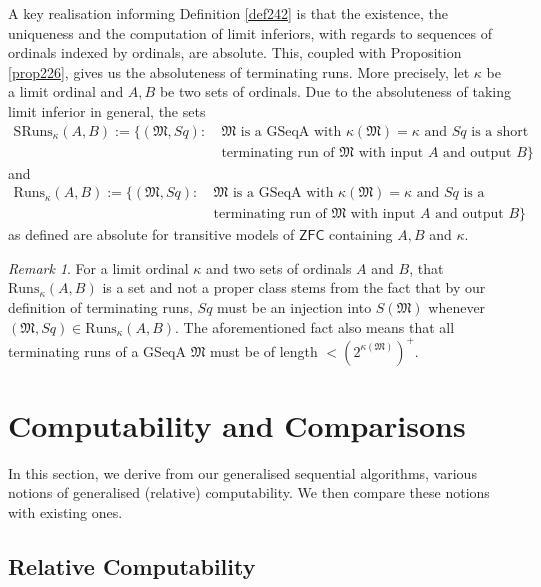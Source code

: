 \documentclass[12pt, twoside]{memoir}
\numberwithin{equation}{section}
\theoremstyle{definition}
\theoremstyle{remark}
\newtheorem{rem}[thm]{Remark}
\theoremstyle{definition}
\theoremstyle{definition}
\theoremstyle{definition}
\theoremstyle{remark}
\begin{document}
A key realisation informing Definition \ref{def242} is that the existence, the uniqueness and the computation of limit inferiors, with regards to sequences of ordinals indexed by ordinals, are absolute. This, coupled with Proposition \ref{prop226}, gives us the absoluteness of terminating runs. More precisely, let $\kappa$ be a limit ordinal and $A, B$ be two sets of ordinals. Due to the absoluteness of taking limit inferior in general, the sets
\begin{align*}
    \mathrm{SRuns}_{\kappa}(A, B) := \{(\mathfrak{M}, Sq) : \ & \mathfrak{M} \text{ is a GSeqA with } \kappa(\mathfrak{M}) = \kappa \text{ and } Sq \text{ is a short} \\
    & \text{terminating run of } \mathfrak{M} \text{ with input } A \text{ and output } B\}
\end{align*}
and
\begin{align*}
    \mathrm{Runs}_{\kappa}(A, B) := \{(\mathfrak{M}, Sq) : \ & \mathfrak{M} \text{ is a GSeqA with } \kappa(\mathfrak{M}) = \kappa \text{ and } Sq \text{ is a} \\
    & \text{terminating run of } \mathfrak{M} \text{ with input } A \text{ and output } B\}
\end{align*}
as defined are absolute for transitive models of $\mathsf{ZFC}$ containing $A, B$ and $\kappa$. 

\begin{rem}\label{rem243}
For a limit ordinal $\kappa$ and two sets of ordinals $A$ and $B$, that $\mathrm{Runs}_{\kappa}(A, B)$ is a set and not a proper class stems from the fact that by our definition of terminating runs, $Sq$ must be an injection into $S(\mathfrak{M})$ whenever $(\mathfrak{M}, Sq) \in \mathrm{Runs}_{\kappa}(A, B)$. The aforementioned fact also means that all terminating runs of a GSeqA $\mathfrak{M}$ must be of length $< (2^{\kappa(\mathfrak{M})})^+$.
\end{rem}

\section{Computability and Comparisons}

In this section, we derive from our generalised sequential algorithms, various notions of generalised (relative) computability. We then compare these notions with existing ones.

\subsection{Relative Computability}
\end{document}
